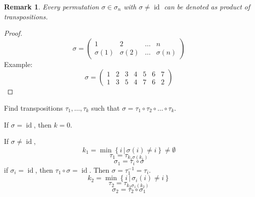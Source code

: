 \documentclass{article}
\newtheorem{remark}{Remark}  \numberwithin{remark}{section}
\newcommand{\setdef}[2]{\left\{\left.#1\,\right|\,#2\right\}}
\begin{document}
\begin{remark}
  Every permutation $\sigma \in \sigma_n$ with $\sigma \neq \operatorname{id}$ can be denoted as product of transpositions.
\end{remark}

\begin{proof}
  \[ \sigma = \begin{pmatrix} 1 & 2 & \dots & n \\ \sigma(1) & \sigma(2) & \dots & \sigma(n) \end{pmatrix} \]
  Example:
  \[ \sigma = \begin{pmatrix} 1 & 2 & 3 & 4 & 5 & 6 & 7 \\ 1 & 3 & 5 & 4 & 7 & 6 & 2 \end{pmatrix} \]
\end{proof}

Find transpositions $\tau_1, \dots, \tau_k$ such that $\sigma = \tau_1 \circ \tau_2 \circ \dots \circ \tau_k$.

If $\sigma = \operatorname{id}$, then $k=0$.

If $\sigma \neq \operatorname{id}$,
\[ k_1 = \min\setdef{i}{\sigma(i) \neq i} \neq \emptyset \]
\[ \tau_1 = \tau_{k_1 \sigma(k_1)} \]
\[ \sigma_1 = \tau_i \circ \sigma \]
if $\sigma_i = \operatorname{id}$, then $\tau_1 \circ \sigma = \operatorname{id}$. Then $\sigma = \tau_1^{-1} = \tau_i$.
\[ k_2 = \min\setdef{i}{\sigma_i(i) \neq i} \]
\[ \tau_2 = \tau_{k_2 \sigma_1(k_2)} \]
\[ \sigma_2 = \tau_2 \circ \sigma_1 \]
\end{document}
